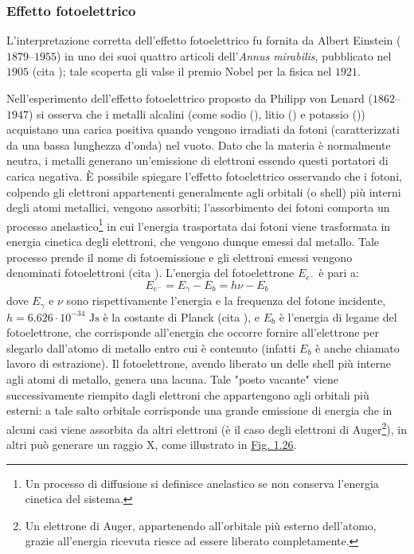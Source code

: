 \documentclass[12pt,a4paper,twoside]{report}
\begin{document}
	\subsubsection{Effetto fotoelettrico}\label{par:effetto_fotoelettrico}
	L'interpretazione corretta dell'effetto fotoelettrico fu fornita da Albert Einstein ($1879$--$1955$) in uno dei suoi quattro articoli dell'\textit{Annus mirabilis}, pubblicato nel $1905$ (cita
	); tale scoperta gli valse il premio Nobel per la fisica nel $1921$.
	
	Nell'esperimento dell'effetto fotoelettrico proposto da Philipp von Lenard ($1862$--$1947$) si osserva che i metalli alcalini (come sodio (), litio () e potassio ()) acquistano una carica positiva quando vengono irradiati da fotoni (caratterizzati da una bassa lunghezza d'onda) nel vuoto. Dato che la materia è normalmente neutra, i metalli generano un'emissione di elettroni essendo questi portatori di carica negativa. \`E possibile spiegare l'effetto fotoelettrico osservando che i fotoni, colpendo gli elettroni appartenenti generalmente agli orbitali (o shell) più interni degli atomi metallici, vengono assorbiti; l'assorbimento dei fotoni comporta un processo anelastico\footnote{Un processo di diffusione si definisce anelastico se non conserva l'energia cinetica del sistema.} in cui l'energia trasportata dai fotoni viene trasformata in energia cinetica degli elettroni, che vengono dunque emessi dal metallo. Tale processo prende il nome di fotoemissione e gli elettroni emessi vengono denominati fotoelettroni (cita
	). L'energia del fotoelettrone $E_{e^-}$ è pari a:
	\begin{equation}
		E_{e^-}=E_\gamma-E_b=h\nu-E_b
		\label{eq:fotoelettrico}
	\end{equation}
	dove $E_\gamma$ e $\nu$ sono rispettivamente l'energia e la frequenza del fotone incidente, $h=6.626\cdot 10^{-34}\mbox{ Js}$ è la costante di Planck (cita
	), e $E_b$ è l'energia di legame del fotoelettrone, che corrisponde all'energia che occorre fornire all'elettrone per slegarlo dall'atomo di metallo entro cui è contenuto (infatti $E_b$ è anche chiamato lavoro di estrazione). Il fotoelettrone, avendo liberato un delle shell più interne agli atomi di metallo, genera una lacuna. Tale "posto vacante" viene successivamente riempito dagli elettroni che appartengono agli orbitali più esterni: a tale salto orbitale corrisponde una grande emissione di energia che in alcuni casi viene assorbita da altri elettroni (è il caso degli elettroni di Auger\footnote{Un elettrone di Auger, appartenendo all'orbitale più esterno dell'atomo, grazie all'energia ricevuta riesce ad essere liberato completamente.}), in altri può generare un raggio X, come illustrato in \hyperref[fig:fotoelettrico]{Fig. 1.26}.
	
\end{document}
